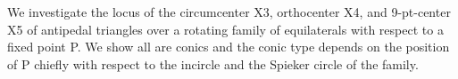 We investigate the locus of the circumcenter X3, orthocenter X4, and 9-pt-center X5 of antipedal triangles over a rotating family of equilaterals with respect to a fixed point P. We show all are conics and the conic type depends on the position of P chiefly with respect to the incircle and the Spieker circle of the family.